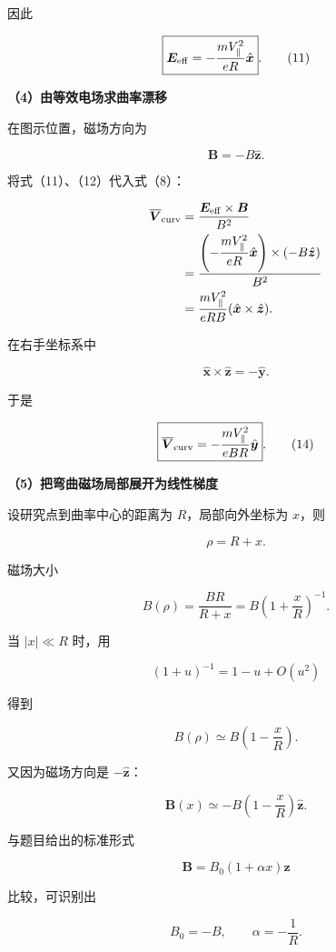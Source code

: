 \documentclass[12pt,a4paper,UTF8]{ctexart}
\begin{document}
因此

\[
\boxed{
\boldsymbol E_{\rm eff}
=-\frac{mV_{\parallel}^2}{eR}
\hat{\boldsymbol x}
}.
\tag{11}
\]

\textbf{（4）由等效电场求曲率漂移}

在图示位置，磁场方向为

\[
\boldsymbol B=-B\hat{\boldsymbol z}.
\tag{12}
\]

将式（11）、（12）代入式（8）：

\[
\begin{aligned}
\overline{\boldsymbol V}_{\rm curv}
&=\frac{\boldsymbol E_{\rm eff}\times\boldsymbol B}{B^2}\\
&=\frac{
\left(-\dfrac{mV_{\parallel}^2}{eR}\hat{\boldsymbol x}\right)
\times\left(-B\hat{\boldsymbol z}\right)
}{B^2}\\
&=\frac{mV_{\parallel}^2}{eRB}
(\hat{\boldsymbol x}\times\hat{\boldsymbol z}).
\end{aligned}
\]

在右手坐标系中

\[
\hat{\boldsymbol x}\times\hat{\boldsymbol z}
=-\hat{\boldsymbol y}.
\tag{13}
\]

于是

\[
\boxed{
\overline{\boldsymbol V}_{\rm curv}
=-\frac{mV_{\parallel}^2}{eBR}
\hat{\boldsymbol y}
}.
\tag{14}
\]

\textbf{（5）把弯曲磁场局部展开为线性梯度}

设研究点到曲率中心的距离为 \(R\)，局部向外坐标为 \(x\)，则

\[
\rho=R+x.
\tag{15}
\]

磁场大小

\[
B(\rho)=\frac{BR}{R+x}
=B\left(1+\frac xR\right)^{-1}.
\tag{16}
\]

当 \(|x|\ll R\) 时，用

\[
(1+u)^{-1}=1-u+O(u^2)
\]

得到

\[
B(\rho)
\simeq B\left(1-\frac xR\right).
\tag{17}
\]

又因为磁场方向是 \(-\hat{\boldsymbol z}\)：

\[
\boldsymbol B(x)
\simeq -B\left(1-\frac xR\right)
\hat{\boldsymbol z}.
\tag{18}
\]

与题目给出的标准形式

\[
\boldsymbol B=B_0(1+\alpha x)\hat{\boldsymbol z}
\]

比较，可识别出

\[
B_0=-B,
\qquad
\alpha=-\frac1R.
\tag{19}
\]
\end{document}
